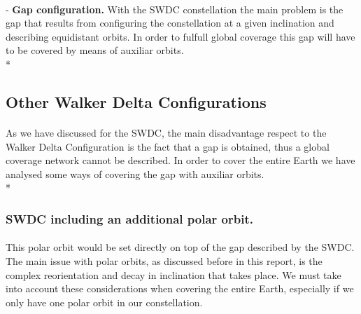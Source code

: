 \paragraph{ }

-	\textbf{Gap configuration.} With the SWDC constellation the main problem is the gap that results from configuring the constellation at a given inclination and describing equidistant orbits. In order to fulfull global coverage this gap will have to be covered by means of auxiliar orbits. \\*


\subsection{Other Walker Delta Configurations}
\paragraph{ }
As we have discussed for the SWDC, the main disadvantage respect to the Walker Delta Configuration is the fact that a gap is obtained, thus a global coverage network cannot be described. In order to cover the entire Earth we have analysed some ways of covering the gap with auxiliar orbits. \\*



\subsubsection{SWDC including an additional polar orbit.}
\paragraph{ }
This polar orbit would be set directly on top of the gap described by the SWDC. The main issue with polar orbits, as discussed before in this report, is the complex reorientation and decay in inclination that takes place. We must take into account these considerations when covering the entire Earth, especially if we only have one polar orbit in our constellation. 

